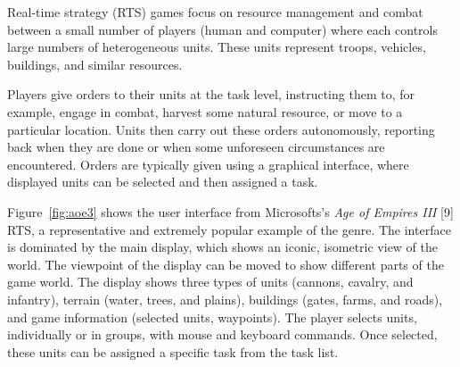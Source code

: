 
Real-time strategy (RTS) games focus on resource management and combat between a small number of players (human and computer) where each controls large numbers of heterogeneous units. These units represent troops, vehicles, buildings, and similar resources.

Players give orders to their units at the task level, instructing them to, for example, engage in combat, harvest some natural resource, or move to a particular location. Units then carry out these orders autonomously, reporting back when they are done or when some unforeseen circumstances are encountered. Orders are typically given using a graphical interface, where displayed units can be selected and then assigned a task.

Figure~\ref{fig:aoe3} shows the user interface from Microsofts's \emph{Age of Empires III} [9] RTS, a representative and extremely popular example of the genre. The interface is dominated by the main display, which shows an iconic, isometric view of the world. The viewpoint of the display can be moved to show different parts of the game world. The display shows three types of units (cannons, cavalry, and infantry), terrain (water, trees, and plains), buildings (gates, farms, and roads), and game information (selected units, waypoints). The player selects units, individually or in groups, with mouse and keyboard commands. Once selected, these units can be assigned a specific task from the task list.

